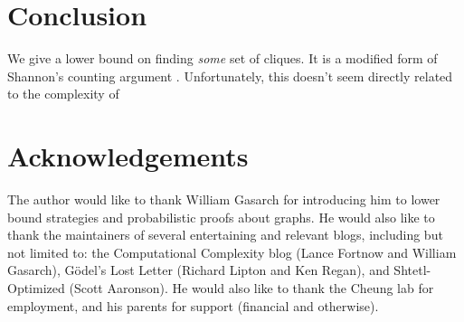 \documentclass[12pt]{article}
\theoremstyle{definition}
\begin{document}
\section{Conclusion}

We give a lower bound on finding {\em some} set of cliques.
It is a modified form of Shannon's counting argument
\cite{shannon_synthesis_1949}. Unfortunately,
this doesn't seem directly related to the
complexity of 

\section{Acknowledgements}

The author would like to thank William Gasarch for introducing him
to lower bound strategies and probabilistic proofs about graphs.
He would also like to thank the maintainers of
several entertaining and relevant blogs, including but
not limited to: the Computational Complexity blog
(Lance Fortnow and William Gasarch), 
G\"odel's Lost Letter (Richard Lipton and Ken Regan),
and Shtetl-Optimized (Scott Aaronson). 
He would
also like to thank the Cheung lab for
employment, and his parents for support
(financial and otherwise).



\end{document}
